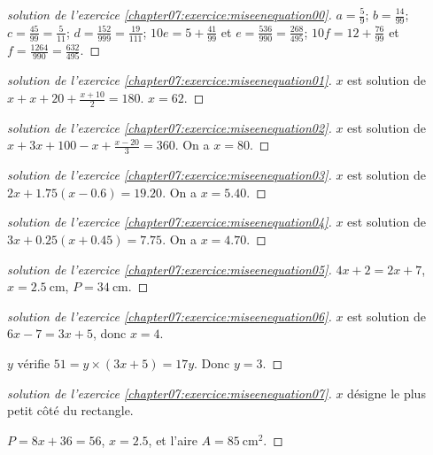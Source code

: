 \begin{proof}[solution de l'exercice \ref{chapter07:exercice:miseenequation00}]\hfill 
	
	$a=\tfrac{5}{9}$; $b=\tfrac{14}{99}$; $c=\tfrac{45}{99}=\tfrac{5}{11}$; $d=\tfrac{152}{999}=\tfrac{19}{111}$; $10e=5+\tfrac{41}{99}$ et $e=\tfrac{536}{990}=\tfrac{268}{495}$; $10f=12+\tfrac{76}{99}$ et $f=\tfrac{1264}{990}=\tfrac{632}{495}$.
\end{proof}
\begin{proof}[solution de l'exercice \ref{chapter07:exercice:miseenequation01}]\hfill 
	
	$x$ est solution de $x+x+20+\tfrac{x+10}{2}=180$. $x=62$. 
\end{proof}
\begin{proof}[solution de l'exercice \ref{chapter07:exercice:miseenequation02}]\hfill 
	
	$x$ est solution de $x+3x+100-x+\tfrac{x-20}{3}=360$. On a $x=80$.
\end{proof}
\begin{proof}[solution de l'exercice \ref{chapter07:exercice:miseenequation03}]\hfill 
	
	$x$ est solution de $2x+1.75(x-0.6)=19.20$. On a $x=5.40$.
\end{proof}
\begin{proof}[solution de l'exercice \ref{chapter07:exercice:miseenequation04}]\hfill 
	
	$x$ est solution de $3x+0.25(x+0.45)=7.75$. On a $x=4.70$.
\end{proof}
\begin{proof}[solution de l'exercice \ref{chapter07:exercice:miseenequation05}]\hfill 
	
	$4x+2=2x+7$, $x=\SI{2.5}{\centi\meter}$, $P=\SI{34}{\centi\meter}$. 
\end{proof}
\begin{proof}[solution de l'exercice \ref{chapter07:exercice:miseenequation06}]  \hfill
	
	$x$ est solution de $6x-7=3x+5$, donc $x=4$. 
	
	$y$ vérifie $51=y\times (3x+5)= 17y$. Donc $y=3$.
\end{proof}
\begin{proof}[solution de l'exercice \ref{chapter07:exercice:miseenequation07}]  \hfill
	
	$x$ désigne le plus petit côté du rectangle.
	
	$P=8x+36=56$, $x=2.5$, et l'aire $A=\SI{85}{\centi\meter^2}$.
\end{proof}


%	 
